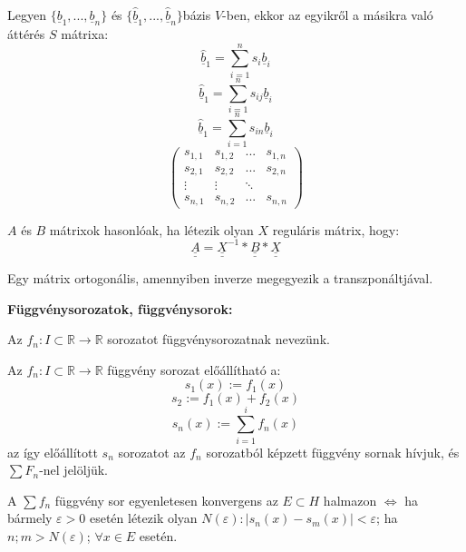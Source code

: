 \documentclass[11pt,a4paper]{article}
\begin{document}
\begin{tcolorbox}[colback=blue!5!white,colframe=blue!70!black,title= 5. Bázistranszformáció]
    Legyen \( \{ \underline{b}_1, ..., \underline{b}_n \}\) és \(\{\hat{ \underline{b}}_1, ..., \hat{\underline{b}}_n \}\)bázis \(V\)-ben, ekkor az egyikről a másikra való áttérés \(S\) mátrixa:
    $$\hat{\underline{b}}_1 = \sum_{i = 1}^{n} s_i \underline{b}_i  $$
    $$\hat{\underline{b}}_1 = \sum_{i = 1}^{n} s_{ij} \underline{b}_i  $$
    $$\hat{\underline{b}}_1 = \sum_{i = 1}^{n} s_{in} \underline{b}_i  $$
    $$\begin{pmatrix}
        s_{1,1} & s_{1,2}  &...  & s_{1,n} \\
        s_{2,1} &s_{2,2}  &...  & s_{2,n} \\ 
        \vdots & \vdots  &  \ddots &  \\
        s_{n,1}&s_{n,2}  & ... & s_{n,n}
        \end{pmatrix}$$
\end{tcolorbox}
\begin{tcolorbox}[colback=blue!5!white,colframe=blue!70!black,title= 6. Hasonló mátrix]
    \(A\) és \(B\) mátrixok hasonlóak, ha létezik olyan \(X\) reguláris mátrix, hogy:
    $$\underline{\underline{A}} = \underline{\underline{X}}^{-1}* \underline{\underline{B}}*\underline{\underline{X}}$$
\end{tcolorbox}
\begin{tcolorbox}[colback=blue!5!white,colframe=blue!70!black,title= 7. Ortogonális mátrix]
    Egy mátrix ortogonális, amennyiben inverze megegyezik a transzponáltjával.  
\end{tcolorbox}
\newpage
\textbf{Függvénysorozatok, függvénysorok:}
\begin{tcolorbox}[colback=blue!5!white,colframe=blue!70!black,title= 1. Függvénysorozat]
    Az \(f_n : I \subset \mathbb{R}\to \mathbb{R}\) sorozatot függvénysorozatnak nevezünk. 
\end{tcolorbox}
\begin{tcolorbox}[colback=blue!5!white,colframe=blue!70!black,title= 2. Függvénysor]
Az \(f_n : I \subset \mathbb{R} \to \mathbb{R}\) függvény sorozat előállítható a:
$$s_1(x) := f_1(x)$$
$$s_2 := f_1(x)+f_2(x)$$
$$s_n(x) := \sum_{i=1}^i f_n(x)$$
az így előállított \(s_n\) sorozatot az \(f_n\) sorozatból képzett függvény sornak hívjuk, és \(\sum F_n\)-nel jelöljük.
\end{tcolorbox}
\begin{tcolorbox}[colback=blue!5!white,colframe=blue!70!black,title= 3. Függvénysorozat{,} függvénysor konvergenciája{,} egyenletes konvergenciája]
    A \(\sum f_n\) függvény sor egyenletesen konvergens az \(E \subset H\) halmazon \(\Longleftrightarrow\)  ha bármely \(\varepsilon > 0\) esetén létezik
olyan \(N(\varepsilon) : \mid s_n(x) - s_m(x)\mid < \varepsilon\); ha \(n;m > N(\varepsilon)\); \(\forall x \in E\) esetén.
\end{tcolorbox}
\end{document}
